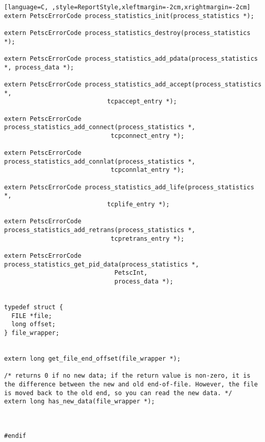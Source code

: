 \documentclass[11pt]{article}
\begin{document}
\begin{lstlisting}[language=C, ,style=ReportStyle,xleftmargin=-2cm,xrightmargin=-2cm]
extern PetscErrorCode process_statistics_init(process_statistics *);

extern PetscErrorCode process_statistics_destroy(process_statistics *);

extern PetscErrorCode process_statistics_add_pdata(process_statistics *, process_data *);

extern PetscErrorCode process_statistics_add_accept(process_statistics *,
						    tcpaccept_entry *);

extern PetscErrorCode process_statistics_add_connect(process_statistics *,
						     tcpconnect_entry *);

extern PetscErrorCode process_statistics_add_connlat(process_statistics *,
						     tcpconnlat_entry *);

extern PetscErrorCode process_statistics_add_life(process_statistics *,
						    tcplife_entry *);

extern PetscErrorCode process_statistics_add_retrans(process_statistics *,
						     tcpretrans_entry *);

extern PetscErrorCode process_statistics_get_pid_data(process_statistics *,
						      PetscInt,
						      process_data *);
						      

typedef struct {
  FILE *file;
  long offset;
} file_wrapper;


extern long get_file_end_offset(file_wrapper *);

/* returns 0 if no new data; if the return value is non-zero, it is the difference between the new and old end-of-file. However, the file is moved back to the old end, so you can read the new data. */
extern long has_new_data(file_wrapper *);



#endif
\end{lstlisting}
\end{document}
